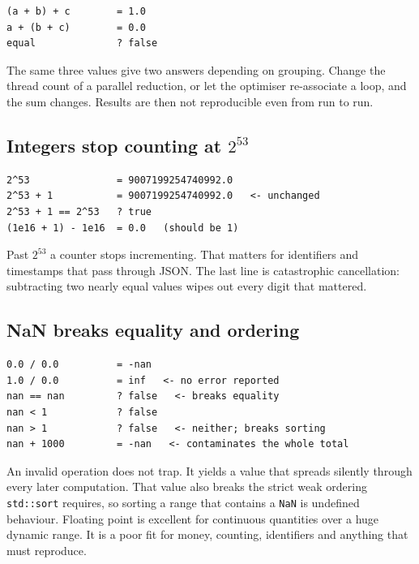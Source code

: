 \documentclass[11pt,a4paper]{article}
\newcommand{\code}[1]{\texttt{\small #1}}
\begin{document}

\begin{lstlisting}[style=term]
(a + b) + c        = 1.0
a + (b + c)        = 0.0
equal              ? false
\end{lstlisting}

\noindent
The same three values give two answers depending on grouping. Change the
thread count of a parallel reduction, or let the optimiser re-associate a loop,
and the sum changes. Results are then not reproducible even from run to run.

\subsection{Integers stop counting at $2^{53}$}


\begin{lstlisting}[style=term]
2^53               = 9007199254740992.0
2^53 + 1           = 9007199254740992.0   <- unchanged
2^53 + 1 == 2^53   ? true
(1e16 + 1) - 1e16  = 0.0   (should be 1)
\end{lstlisting}

\noindent
Past $2^{53}$ a counter stops incrementing. That matters for identifiers and
timestamps that pass through JSON. The last line is catastrophic cancellation:
subtracting two nearly equal values wipes out every digit that mattered.

\subsection{NaN breaks equality and ordering}

\begin{lstlisting}[style=term]
0.0 / 0.0          = -nan
1.0 / 0.0          = inf   <- no error reported
nan == nan         ? false   <- breaks equality
nan < 1            ? false
nan > 1            ? false   <- neither; breaks sorting
nan + 1000         = -nan   <- contaminates the whole total
\end{lstlisting}

\noindent
An invalid operation does not trap. It yields a value that spreads silently
through every later computation. That value also breaks the strict weak
ordering \code{std::sort} requires, so sorting a range that contains a
\code{NaN} is undefined behaviour. Floating point is excellent for continuous
quantities over a huge dynamic range. It is a poor fit for money, counting,
identifiers and anything that must reproduce.
\end{document}
